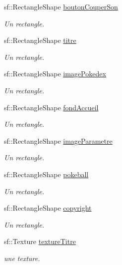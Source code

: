 \begin{DoxyCompactItemize}
sf\+::\+Rectangle\+Shape \hyperlink{class_s_f_m_l_menu_a2db59c62a6ba0fbd36ed5d62668f0429}{bouton\+Couper\+Son}
\begin{DoxyCompactList}\small\item\em Un rectangle. \end{DoxyCompactList}\item 
sf\+::\+Rectangle\+Shape \hyperlink{class_s_f_m_l_menu_a23bd1d0304fdd666825a562609ef6fb5}{titre}
\begin{DoxyCompactList}\small\item\em Un rectangle. \end{DoxyCompactList}\item 
sf\+::\+Rectangle\+Shape \hyperlink{class_s_f_m_l_menu_a91b51e10df431baa523e25a1d49f435d}{image\+Pokedex}
\begin{DoxyCompactList}\small\item\em Un rectangle. \end{DoxyCompactList}\item 
sf\+::\+Rectangle\+Shape \hyperlink{class_s_f_m_l_menu_a276079d83760b4e11b5f7e1a6c2685e3}{fond\+Accueil}
\begin{DoxyCompactList}\small\item\em Un rectangle. \end{DoxyCompactList}\item 
sf\+::\+Rectangle\+Shape \hyperlink{class_s_f_m_l_menu_a14d6195ffe83debda348a246526cbec3}{image\+Parametre}
\begin{DoxyCompactList}\small\item\em Un rectangle. \end{DoxyCompactList}\item 
sf\+::\+Rectangle\+Shape \hyperlink{class_s_f_m_l_menu_a0b5806aa6c7c8634db9b239bb6d9cc44}{pokeball}
\begin{DoxyCompactList}\small\item\em Un rectangle. \end{DoxyCompactList}\item 
sf\+::\+Rectangle\+Shape \hyperlink{class_s_f_m_l_menu_a8d2296e13ee5bf905a387e5a4565b29e}{copyright}
\begin{DoxyCompactList}\small\item\em Un rectangle. \end{DoxyCompactList}\item 
sf\+::\+Texture \hyperlink{class_s_f_m_l_menu_ace19b3f13ad15b2691d0250a469e05cc}{texture\+Titre}
\begin{DoxyCompactList}\small\item\em une texture. \end{DoxyCompactList}\item 

\end{DoxyCompactItemize}
